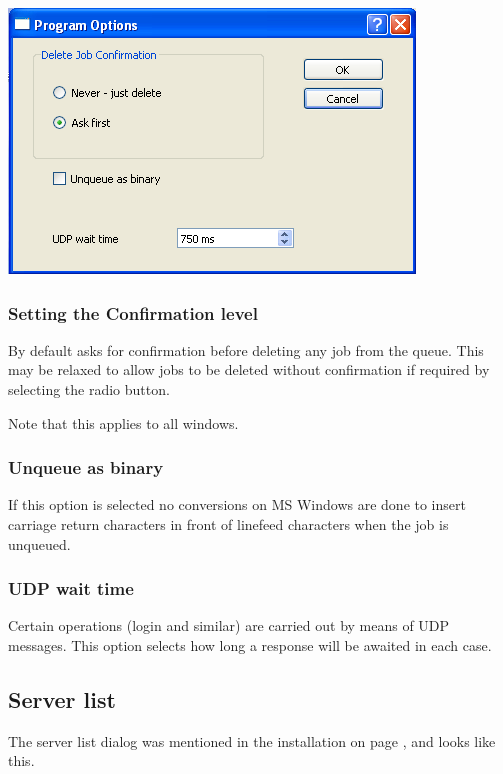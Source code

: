 \includegraphics{img/btqwprogoptsdlg.png}

\subsubsection{Setting the Confirmation level}
By default  asks for confirmation before deleting any job from the
queue. This may be relaxed to allow jobs to be deleted without
confirmation if required by selecting the radio button.

Note that this applies to all windows.

\subsubsection{Unqueue as binary}
If this option is selected no conversions on MS Windows are done to insert carriage return characters
in front of linefeed characters when the job is unqueued.

\subsubsection{UDP wait time}
Certain operations (login and similar) are carried out by means of UDP messages. This option selects how long a
response will be awaited in each case.

\subsection{Server list}
The server list dialog was mentioned in the installation on page \pageref{bkm:installservs}, and looks like this.


